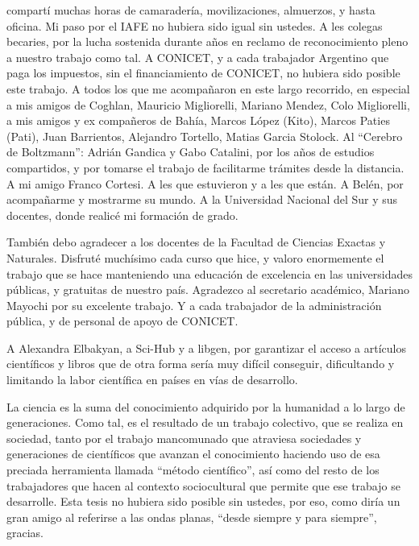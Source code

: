 compartí muchas horas de camaradería, movilizaciones, almuerzos, y hasta oficina. 
Mi paso por el IAFE no hubiera sido igual sin ustedes. 
A les colegas becaries, por la lucha sostenida durante años en reclamo de 
reconocimiento pleno a nuestro trabajo como tal. 
A CONICET, y a cada trabajador Argentino que paga los impuestos, 
sin el financiamiento de CONICET, no hubiera sido posible este trabajo. 
A todos los que me acompañaron en este largo recorrido, 
en especial a mis amigos de Coghlan, Mauricio Migliorelli, Mariano Mendez, Colo Migliorelli, a mis amigos y 
ex compañeros de Bahía, Marcos López (Kito), Marcos Paties (Pati), Juan Barrientos, Alejandro 
Tortello, Matias Garcia Stolock. Al ``Cerebro de Boltzmann'': Adrián Gandica y Gabo Catalini, por 
los años de estudios compartidos, y por tomarse el trabajo de facilitarme trámites desde la distancia. A mi amigo Franco Cortesi. A les que estuvieron y a les que están. A Belén, 
por acompañarme y mostrarme su mundo. A la Universidad Nacional del Sur y sus 
docentes, donde realicé mi formación de grado.

También debo agradecer a los docentes de la Facultad de Ciencias Exactas y Naturales. 
Disfruté muchísimo cada curso que hice, y valoro enormemente el trabajo 
que se hace manteniendo una educación de excelencia en las universidades públicas, 
y gratuitas de nuestro país.
Agradezco al secretario académico, 
Mariano Mayochi por su excelente trabajo. 
Y a cada trabajador de la administración pública, y de personal de apoyo de 
CONICET. 

A Alexandra Elbakyan, a Sci-Hub y a libgen, por garantizar el acceso 
a artículos científicos y libros que de otra forma sería muy difícil conseguir, 
dificultando y limitando la labor científica en países en vías de desarrollo.

La ciencia es la suma del conocimiento adquirido por la humanidad 
a lo largo de generaciones. Como tal, es el resultado de un trabajo colectivo, 
que se realiza en sociedad, tanto por el trabajo mancomunado 
que atraviesa sociedades y generaciones de científicos 
que avanzan el conocimiento haciendo uso 
de esa preciada herramienta llamada ``método científico'', 
así como del resto de los trabajadores que hacen al contexto sociocultural 
que permite que ese trabajo se 
desarrolle. Esta tesis no hubiera sido posible sin ustedes, 
por eso, como diría un gran amigo al referirse 
a las ondas planas, ``desde siempre y para siempre'', gracias.
